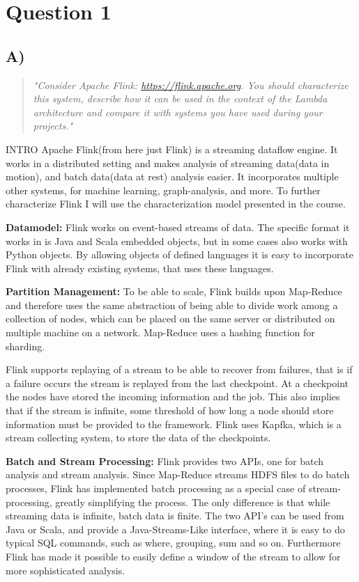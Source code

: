 \section{Question 1}

\subsection{A)}
\begin{quote}
	\textit{"Consider	Apache	Flink: \url{https://flink.apache.org}.	You	should	characterize	this	system,	describe	how	it	can	be	used	in	the	context	of	the	Lambda	architecture	and	compare	it	with	systems	you	have	used	during	your	projects."}
\end{quote}
\newpar INTRO
Apache Flink(from here just Flink) is a streaming dataflow engine. It works in a distributed setting and makes analysis of streaming data(data in motion), and batch data(data at rest) analysis easier. It incorporates multiple other systems, for machine learning, graph-analysis, and more. To further characterize Flink I will use the characterization model presented in the course.

\newpar \textbf{Datamodel:} Flink works on event-based streams of data. The specific format it works in is Java and Scala embedded objects, but in some cases also works with Python objects. By allowing objects of defined languages it is easy to incorporate Flink with already existing systems, that uses these languages.

\newpar \textbf{Partition Management:} To be able to scale, Flink builds upon Map-Reduce  and therefore uses the same abstraction of being able to divide work among a collection of nodes, which can be placed on the same server or distributed on multiple machine on a network. Map-Reduce uses a hashing  function for sharding. 

Flink supports replaying of a stream to be able to recover from failures, that is if a failure occurs the stream is replayed from the last checkpoint. At a checkpoint the nodes have stored the incoming information and the job. This also implies that if the stream is infinite, some threshold of how long a node should store information must be provided to the framework. Flink uses Kapfka, which is a stream collecting system, to store the data of the checkpoints.

\newpar \textbf{Batch and Stream Processing:} Flink provides two APIs, one for batch analysis and stream analysis. Since Map-Reduce streams HDFS files to do batch processes, Flink has implemented batch processing as a special case of stream-processing, greatly simplifying the process. The only difference is that while streaming data is infinite, batch data is finite. The two API's can be used from Java or Scala, and provide a Java-Streams-Like interface, where it is easy to do typical SQL commands, such as where, grouping, sum and so on. Furthermore Flink has made it possible to easily define a window of the stream to allow for more sophisticated analysis.

